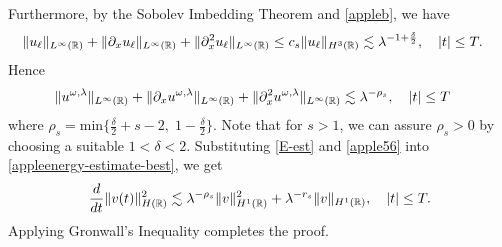 %
%
Furthermore, by the Sobolev Imbedding Theorem and \cref{appleb}, we have
%
%
%
%
\begin{equation*}
\begin{split}
\|u_\ell\|_{L^\infty(\mathbb{R})} + \|\partial_x u_\ell \|_{L^\infty(\mathbb{R})} + \|\partial_x^2
u_\ell\|_{L^\infty(\mathbb{R})}
& \le c_s \|u_\ell\|_{H^3(\mathbb{R})} 
\lesssim \lambda^{-1 + \frac{\delta}{2}}, 
\quad |t| \le T.
\label{apple55}
\end{split}
\end{equation*}
%
%
Hence
%
%
\begin{equation}
\begin{split}
\|u^{\omega,\lambda}\|_{L^\infty(\mathbb{R})} + \|\partial_x 
u^{\omega,\lambda}\|_{L^\infty(\mathbb{R})} + \|\partial_x^2
u^{\omega,\lambda}\|_{L^\infty(\mathbb{R})}
& \lesssim \lambda^{-\rho_s}, \quad |t| \le T
\label{apple56}
\end{split}
\end{equation}
%
%
where $\rho_s = \text{min} \Big\{ \frac{\delta}{2} + s -2, \; 1-
\frac{\delta}{2} \Big\}$.  Note that for $s>1$, we can assure $\rho_s > 0$
by choosing a suitable $1<\delta<2$.
Substituting \eqref{E-est} and \eqref{apple56} into \eqref{appleenergy-estimate-best},
we get
%
%
\begin{equation}
\label{apple58}
\frac{d}{dt} \|v(t)\|_{H(\mathbb{R})}^2 \lesssim \lambda^{-\rho_s}
\|v\|_{H^1(\mathbb{R})}^2 + \lambda^{-r_s}
\|v \|_{H^1(\mathbb{R})}, \quad |t| \le T.
\end{equation}
%
%
Applying Gronwall's Inequality completes the proof. \qquad \qedsymbol%
%
%
%
%

